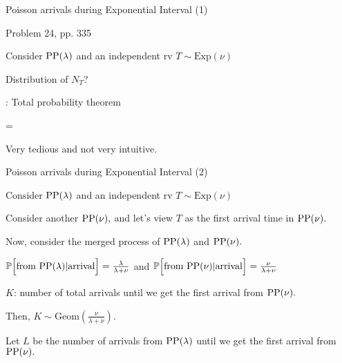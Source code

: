 
\begin{frame}{Poisson arrivals during Exponential Interval (1)}

\plitemsep 0.1in

\bci

\item Problem 24, pp. 335

\item Consider $\text{PP}(\lambda)$ and an independent rv $T \sim \text{Exp}(\nu)$

\item<2-> \question Distribution of $N_T$?

\item<3-> : Total probability theorem

\aleq
  {
     = 
  }
  
\item<5-> Very tedious and not very intuitive. 

  \eci


\end{frame}


\begin{frame}{Poisson arrivals during Exponential Interval (2)}

\plitemsep 0.1in

\bci

\item Consider $\text{PP}(\lambda)$ and an independent rv $T \sim \text{Exp}(\nu)$
\item<2-> Consider another $\text{PP}(\nu),$ and let's view $T$ as the first
  arrival time in $\text{PP}(\nu).$

\item<3-> Now, consider the merged process of $\text{PP}(\lambda)$ and
  $\text{PP}(\nu).$
  \bci
\item $\mathbb{P}\Bigl[ \text{from $\text{PP}(\lambda)$}| \text{arrival} \Bigr] =
  \frac{\lambda}{\lambda+\nu}$ and $\mathbb{P}\Bigl[ \text{from $\text{PP}(\nu)$}| \text{arrival} \Bigr] =
  \frac{\nu}{\lambda+\nu}$ 
  \eci
\item<4-> $K$: number of total arrivals until we get the first arrival from
  $\text{PP}(\nu).$
  \bci
\item<5->   Then, $K \sim \text{Geom}(\frac{\nu}{\lambda+\nu}).$

  \eci


\item<6-> Let $L$ be the number of arrivals from $\text{PP}(\lambda)$
  until we get the first arrival from $\text{PP}(\nu).$

  \eci


\end{frame}



